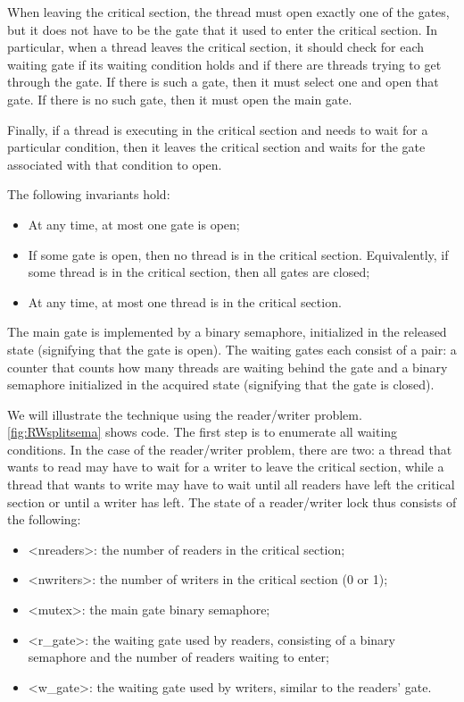 \documentclass{report}
\begin{document}
When leaving the critical section, the thread must open exactly one
of the gates, but it does not have to be the gate that it used to enter
the critical section.
In particular, when a thread leaves the critical section, it should
check for each waiting gate if its waiting condition holds and if there are
threads trying to get through the gate.  If there is such a gate, then
it must select one and open that gate.  If there is no such gate, then
it must open the main gate.

Finally, if a thread is executing in the critical section and needs to
wait for a particular condition, then it leaves the critical section and
waits for the gate associated with that condition to open.

The following invariants hold:
\begin{itemize}
\item At any time, at most one gate is open;
\item If some gate is open, then no thread is in the critical section.  Equivalently, if some thread is in the critical section, then all gates are closed;
\item At any time, at most one thread is in the critical section.
\end{itemize}

The main gate is implemented by a binary semaphore, initialized in the
released state (signifying that the gate is open).
The waiting gates each consist of a pair: a counter that counts how many
threads are waiting behind the gate and a binary semaphore initialized
in the acquired state (signifying that the gate is closed).

We will illustrate the technique using the reader/writer problem.
\autoref{fig:RWsplitsema} shows code.
The first step is to enumerate all waiting conditions.
In the case of the reader/writer
problem, there are two: a thread that wants to read may have to wait for a
writer to leave the critical section, while a thread that wants to write may
have to wait until all readers have left the critical section or until a writer has left.
%
The state of a reader/writer lock thus consists of the following:
\begin{itemize}
\item <{nreaders}>: the number of readers in the critical section;
\item <{nwriters}>: the number of writers in the critical section (0 or 1);
\item <{mutex}>: the main gate binary semaphore;
\item <{r_gate}>: the waiting gate used by readers, consisting of a binary semaphore and the number of readers waiting to enter;
\item <{w_gate}>: the waiting gate used by writers, similar to the readers' gate.
\end{itemize}
\end{document}
